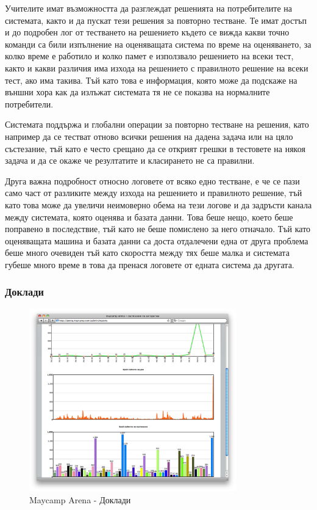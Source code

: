 \documentclass[a4paper,12pt]{article}
\begin{document}
  Учителите имат възможността да разглеждат решенията на потребителите на системата, както и да пускат тези решения за повторно тестване. Те имат достъп и до подробен лог от тестването на решението където се вижда какви точно команди са били изпълнение на оценяващата система по време на оценяването, за колко време е работило и колко памет е използвало решението на всеки тест, както и какви различия има изхода на решението с правилното решение на всеки тест, ако има такива. Тъй като това е информация, която може да подскаже на външни хора как да излъжат системата тя не се показва на нормалните потребители.
  
  Системата поддържа и глобални операции за повторно тестване на решения, като например да се тестват отново всички решения на дадена задача или на цяло състезание, тъй като е често срещано да се открият грешки в тестовете на някоя задача и да се окаже че резултатите и класирането не са правилни.
  
  Друга важна подробност относно логовете от всяко едно тестване, е че се пази само част от разликите между изхода на решението и правилното решение, тъй като това може да увеличи неимоверно обема на тези логове и да задръсти канала между системата, която оценява и базата данни. Това беше нещо, което беше поправено в последствие, тъй като не беше помислено за него отначало. Тъй като оценяващата машина и базата данни са доста отдалечени една от друга проблема беше много очевиден тъй като скоростта между тях беше малка и системата губеше много време в това да пренася логовете от едната система да другата.
  
  \subsubsection{Доклади}

  \begin{figure}[ht]
    \begin{center}
      \includegraphics[width=0.8\textwidth]{images/maycamp_arena_reports.png}
    \end{center}
    \caption{Maycamp Arena - Доклади}
    \label{arena_reports}
  \end{figure}
  
\end{document}
